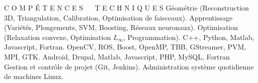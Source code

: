 




\begin{rubric}{C O M P \'{E} T E N C E S ~~ T E C H N I Q U E S}
  G\'{e}om\'{e}trie (Reconstruction 3D, Triangulation, Calibration, Optimisation de faisceaux).
  Apprentissage (Vari\'{e}t\'{e}s, Plongements, SVM, Boosting, R\'{e}seaux neuronaux).
  Optimisation (Relaxation convexe, Optimisation $L_{\infty}$, Programmation).
\entry*[Langages]
  C++, Python, Matlab, Javascript, Fortran.
 OpenCV, ROS, Boost, OpenMP, TBB, GStreamer, PVM, MPI, GTK.
\entry*[Autres]
  Android, Drupal, Matlab, Javascript, PHP, MySQL, Fortran \\
\entry*[Autres]
  Gestion et contr\^{o}le de projet (Git, Jenkins).
\entry*[Autres]
  Administration syst\`{e}me quotidienne de machines Linux.
\end{rubric}


